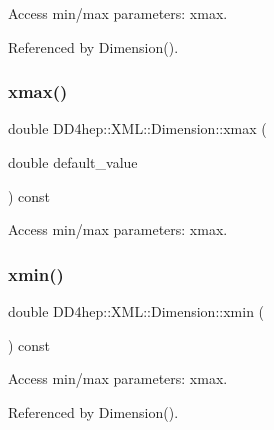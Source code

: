Access min/max parameters\+: xmax. 



Referenced by Dimension().

\hypertarget{struct_d_d4hep_1_1_x_m_l_1_1_dimension_a082d503b8d74d862160484901720a212}{}\label{struct_d_d4hep_1_1_x_m_l_1_1_dimension_a082d503b8d74d862160484901720a212} 
\subsubsection{\texorpdfstring{xmax()}{xmax()}\hspace{0.1cm}{\footnotesize\ttfamily [2/2]}}
{\footnotesize\ttfamily double D\+D4hep\+::\+X\+M\+L\+::\+Dimension\+::xmax (\begin{DoxyParamCaption}\item[{double}]{default\+\_\+value }\end{DoxyParamCaption}) const}



Access min/max parameters\+: xmax. 

\hypertarget{struct_d_d4hep_1_1_x_m_l_1_1_dimension_af8c0c3b620b90685dbca93a5b9338dc8}{}\label{struct_d_d4hep_1_1_x_m_l_1_1_dimension_af8c0c3b620b90685dbca93a5b9338dc8} 
\subsubsection{\texorpdfstring{xmin()}{xmin()}\hspace{0.1cm}{\footnotesize\ttfamily [1/2]}}
{\footnotesize\ttfamily double D\+D4hep\+::\+X\+M\+L\+::\+Dimension\+::xmin (\begin{DoxyParamCaption}{ }\end{DoxyParamCaption}) const}



Access min/max parameters\+: xmax. 



Referenced by Dimension().

\hypertarget{struct_d_d4hep_1_1_x_m_l_1_1_dimension_a3f6383624dfd9ee78e213d680ffefb01}{}\label{struct_d_d4hep_1_1_x_m_l_1_1_dimension_a3f6383624dfd9ee78e213d680ffefb01} 
